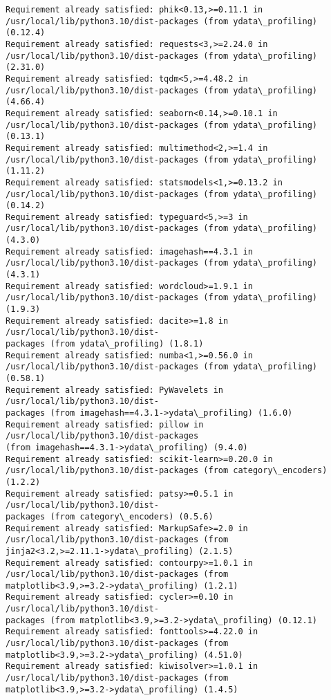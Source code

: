 \documentclass[11pt]{article}
\begin{document}
\begin{Verbatim}[commandchars=\\\{\}]
Requirement already satisfied: phik<0.13,>=0.11.1 in
/usr/local/lib/python3.10/dist-packages (from ydata\_profiling) (0.12.4)
Requirement already satisfied: requests<3,>=2.24.0 in
/usr/local/lib/python3.10/dist-packages (from ydata\_profiling) (2.31.0)
Requirement already satisfied: tqdm<5,>=4.48.2 in
/usr/local/lib/python3.10/dist-packages (from ydata\_profiling) (4.66.4)
Requirement already satisfied: seaborn<0.14,>=0.10.1 in
/usr/local/lib/python3.10/dist-packages (from ydata\_profiling) (0.13.1)
Requirement already satisfied: multimethod<2,>=1.4 in
/usr/local/lib/python3.10/dist-packages (from ydata\_profiling) (1.11.2)
Requirement already satisfied: statsmodels<1,>=0.13.2 in
/usr/local/lib/python3.10/dist-packages (from ydata\_profiling) (0.14.2)
Requirement already satisfied: typeguard<5,>=3 in
/usr/local/lib/python3.10/dist-packages (from ydata\_profiling) (4.3.0)
Requirement already satisfied: imagehash==4.3.1 in
/usr/local/lib/python3.10/dist-packages (from ydata\_profiling) (4.3.1)
Requirement already satisfied: wordcloud>=1.9.1 in
/usr/local/lib/python3.10/dist-packages (from ydata\_profiling) (1.9.3)
Requirement already satisfied: dacite>=1.8 in /usr/local/lib/python3.10/dist-
packages (from ydata\_profiling) (1.8.1)
Requirement already satisfied: numba<1,>=0.56.0 in
/usr/local/lib/python3.10/dist-packages (from ydata\_profiling) (0.58.1)
Requirement already satisfied: PyWavelets in /usr/local/lib/python3.10/dist-
packages (from imagehash==4.3.1->ydata\_profiling) (1.6.0)
Requirement already satisfied: pillow in /usr/local/lib/python3.10/dist-packages
(from imagehash==4.3.1->ydata\_profiling) (9.4.0)
Requirement already satisfied: scikit-learn>=0.20.0 in
/usr/local/lib/python3.10/dist-packages (from category\_encoders) (1.2.2)
Requirement already satisfied: patsy>=0.5.1 in /usr/local/lib/python3.10/dist-
packages (from category\_encoders) (0.5.6)
Requirement already satisfied: MarkupSafe>=2.0 in
/usr/local/lib/python3.10/dist-packages (from
jinja2<3.2,>=2.11.1->ydata\_profiling) (2.1.5)
Requirement already satisfied: contourpy>=1.0.1 in
/usr/local/lib/python3.10/dist-packages (from
matplotlib<3.9,>=3.2->ydata\_profiling) (1.2.1)
Requirement already satisfied: cycler>=0.10 in /usr/local/lib/python3.10/dist-
packages (from matplotlib<3.9,>=3.2->ydata\_profiling) (0.12.1)
Requirement already satisfied: fonttools>=4.22.0 in
/usr/local/lib/python3.10/dist-packages (from
matplotlib<3.9,>=3.2->ydata\_profiling) (4.51.0)
Requirement already satisfied: kiwisolver>=1.0.1 in
/usr/local/lib/python3.10/dist-packages (from
matplotlib<3.9,>=3.2->ydata\_profiling) (1.4.5)

\end{Verbatim}
\end{document}
